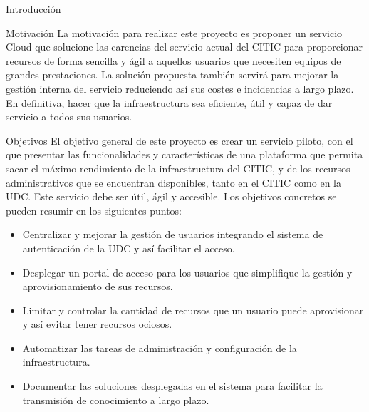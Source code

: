 \begin{chapter}{Introducción}
\begin{section}{Motivación}
La motivación para realizar este proyecto es proponer un servicio Cloud que solucione las carencias del servicio actual del CITIC para proporcionar recursos de forma sencilla y ágil a aquellos usuarios que necesiten equipos de grandes prestaciones. La solución propuesta también servirá para mejorar la gestión interna del servicio reduciendo así sus costes e incidencias a largo plazo. En definitiva, hacer que la infraestructura sea eficiente, útil y capaz de dar servicio a todos sus usuarios.
\end{section}
\begin{section}{Objetivos}
El objetivo general de este proyecto es crear un servicio piloto, con el que presentar las funcionalidades y características de una plataforma que permita sacar el máximo rendimiento de la infraestructura del CITIC, y de los recursos administrativos que se encuentran disponibles, tanto en el CITIC como en la UDC. Este servicio debe ser útil, ágil y accesible. Los objetivos concretos se pueden resumir en los siguientes puntos:
\begin{itemize}
    \item Centralizar y mejorar la gestión de usuarios integrando el sistema de autenticación de la UDC y así facilitar el acceso.
    \item Desplegar un portal de acceso para los usuarios que simplifique la gestión y aprovisionamiento de sus recursos.
    \item Limitar y controlar la cantidad de recursos que un usuario puede aprovisionar y así evitar tener recursos ociosos.
    \item Automatizar las tareas de administración y configuración de la infraestructura.
    \item Documentar las soluciones desplegadas en el sistema para facilitar la transmisión de conocimiento a largo plazo.
\end{itemize}
\end{section}


\end{chapter}

